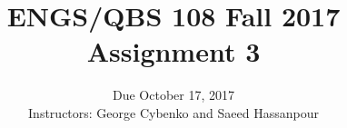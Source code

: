 \documentclass[12pt]{article}
\begin{document}
 


\title{ENGS/QBS 108 Fall 2017 Assignment 3}
\author{Due October 17, 2017 \\ Instructors: George Cybenko and Saeed Hassanpour}
\date{}
\maketitle

\pagebreak

\end{document}
